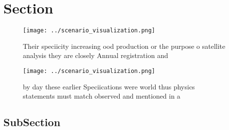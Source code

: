\documentclass[a4paper]{article}
\begin{document}
\section{Section}

\begin{figure}
\centering
\texttt{[image: ../scenario\_visualization.png]}
\caption{Their speciicity increasing ood production or the purpose o satellite analysis they are closely Annual registration and
}
\end{figure}
 
\begin{figure}
\centering
\texttt{[image: ../scenario\_visualization.png]}
\caption{ by day these earlier Speciications were world thus physics statements must match observed and mentioned in a
}
\end{figure}
 
\subsection{SubSection}
\end{document}
